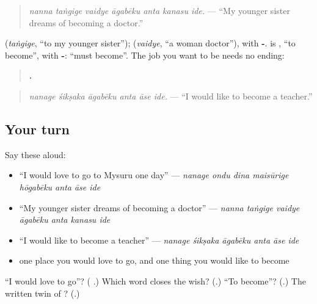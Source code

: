 \begin{quote}
\emph{nanna taṅgige vaidye āgabēku anta kanasu ide.} — \textquotedblleft{}My younger sister dreams of becoming a doctor.\textquotedblright{}
\end{quote}

\textbf{} (\emph{taṅgige}, \textquotedblleft{}to my younger sister\textquotedblright{}); \textbf{} (\emph{vaidye}, \textquotedblleft{}a woman doctor\textquotedblright{}), \textbf{} with \textbf{-}. \textbf{} is \textbf{}, \textquotedblleft{}to become\textquotedblright{}, with \textbf{-}: \textquotedblleft{}must become\textquotedblright{}. The job you want to be needs no ending:

\begin{quote}
\textbf{     .}
\end{quote}

\begin{quote}
\emph{nanage śikṣaka āgabēku anta āse ide.} — \textquotedblleft{}I would like to become a teacher.\textquotedblright{}
\end{quote}

\subsection*{Your turn}
Say these aloud:

\begin{itemize}
\raggedright
  \item \textquotedblleft{}I would love to go to Mysuru one day\textquotedblright{} — \emph{nanage ondu dina maisūrige hōgabēku anta āse ide}
  \item \textquotedblleft{}My younger sister dreams of becoming a doctor\textquotedblright{} — \emph{nanna taṅgige vaidye āgabēku anta kanasu ide}
  \item \textquotedblleft{}I would like to become a teacher\textquotedblright{} — \emph{nanage śikṣaka āgabēku anta āse ide}
  \item one place you would love to go, and one thing you would like to become
\end{itemize}

\begin{tcolorbox}[breakable,colback=teal!4,colframe=teal!35!black,title={Before you move on}]
\textquotedblleft{}I would love to go\textquotedblright{}? (\textbf{    }.) Which word closes the wish? (\textbf{}.) \textquotedblleft{}To become\textquotedblright{}? (\textbf{}.) The written twin of \textbf{ }? (\textbf{}.)
\end{tcolorbox}
